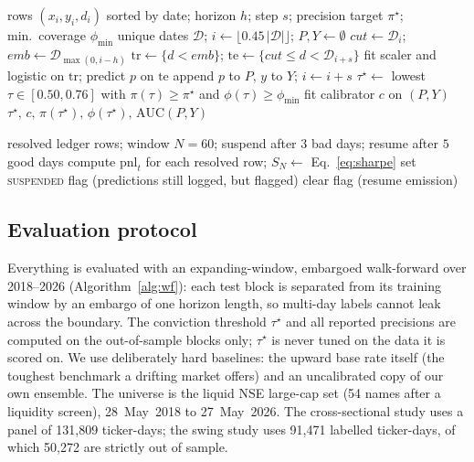 \documentclass[conference]{IEEEtran}
\begin{document}
\begin{algorithm}[t]
\caption{Embargoed walk-forward evaluation and out-of-sample conviction-threshold
selection}
\label{alg:wf}
\begin{algorithmic}[1]
\REQUIRE rows $(x_i,y_i,d_i)$ sorted by date; horizon $h$; step $s$; precision
target $\pi^\star$; min.\ coverage $\phi_{\min}$
\STATE unique dates $\mathcal D$; $i\leftarrow\lfloor 0.45\,|\mathcal D|\rfloor$;
$P,Y\leftarrow\emptyset$
  \STATE $cut\leftarrow\mathcal D_i$; \; $emb\leftarrow\mathcal D_{\max(0,i-h)}$
  \STATE $\mathrm{tr}\leftarrow\{d<emb\}$; \;
         $\mathrm{te}\leftarrow\{cut\le d<\mathcal D_{i+s}\}$
  \STATE fit scaler and logistic on $\mathrm{tr}$; predict $p$ on $\mathrm{te}$
  \STATE append $p$ to $P$, $y$ to $Y$; \; $i\leftarrow i+s$
\ENDWHILE
\STATE $\tau^\star\leftarrow$ lowest $\tau\in[0.50,0.76]$ with
$\pi(\tau)\ge\pi^\star$ and $\phi(\tau)\ge\phi_{\min}$
\STATE fit calibrator $c$ on $(P,Y)$
\RETURN $\tau^\star,\,c,\,\pi(\tau^\star),\,\phi(\tau^\star),\,\mathrm{AUC}(P,Y)$
\end{algorithmic}
\end{algorithm}

\begin{algorithm}[t]
\caption{Rolling-Sharpe circuit breaker (daily, at market close)}
\label{alg:cb}
\begin{algorithmic}[1]
\REQUIRE resolved ledger rows; window $N{=}60$; suspend after $3$ bad days; resume
after $5$ good days
\STATE compute $\mathrm{pnl}_t$ for each resolved row; \;
       $S_N\leftarrow$ Eq.~\eqref{eq:sharpe}
  \STATE set \textsc{suspended} flag (predictions still logged, but flagged)
  \STATE clear flag (resume emission)
\ENDIF
\end{algorithmic}
\end{algorithm}

\subsection{Evaluation protocol}
Everything is evaluated with an expanding-window, embargoed walk-forward over
2018--2026 (Algorithm~\ref{alg:wf}): each test block is separated from its
training window by an embargo of one horizon length, so multi-day labels cannot
leak across the boundary. The conviction threshold $\tau^\star$ and all reported
precisions are computed on the out-of-sample blocks only; $\tau^\star$ is never
tuned on the data it is scored on. We use deliberately hard baselines: the upward
base rate itself (the toughest benchmark a drifting market offers) and an
uncalibrated copy of our own ensemble. The universe is the liquid NSE large-cap set
(54 names after a liquidity screen), 28~May~2018 to 27~May~2026. The
cross-sectional study uses a panel of 131{,}809 ticker-days; the swing study uses
91{,}471 labelled ticker-days, of which 50{,}272 are strictly out of sample.
\end{document}
